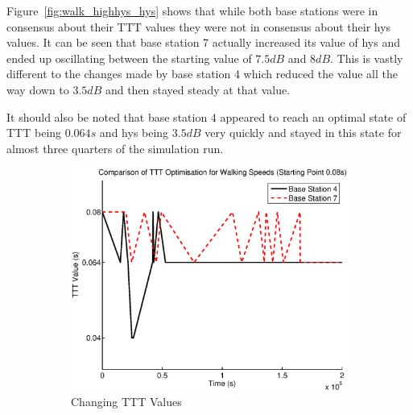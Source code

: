 Figure~\ref{fig:walk_highhys_hys} shows that while both base stations were in consensus about their TTT values they were not in consensus about their hys values. It can be seen that base station 7 actually increased its value of hys and ended up oscillating between the starting value of $7.5 dB$ and $8 dB$. This is vastly different to the changes made by base station 4 which reduced the value all the way down to $3.5 dB$ and then stayed steady at that value.

It should also be noted that base station 4 appeared to reach an optimal state of TTT being $0.064 s$ and hys being $3.5 dB$ very quickly and stayed in this state for almost three quarters of the simulation run.
\begin{figure}[H]
        \centering
        \begin{subfigure}[b]{0.49\textwidth}
                \includegraphics[width=\textwidth]{figures/walking_figures/highhys/long_ttt.eps}
                \caption{Changing TTT Values}
                \label{fig:walk_highhys_ttt}
        \end{subfigure}%
        ~ %
        \begin{subfigure}[b]{0.49\textwidth}

\end{subfigure}
\end{figure}
